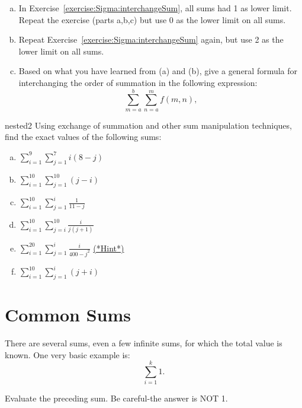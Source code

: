 \begin{exercise}{}
\begin{enumerate}[(a)]
\item
In Exercise~\ref{exercise:Sigma:interchangeSum}, all sums had 1 as lower limit.  Repeat the exercise (parts a,b,c) but use 0 as the lower limit on all sums.
\item
Repeat Exercise~\ref{exercise:Sigma:interchangeSum} again, but use 2 as the lower limit on all sums.
\item
Based on what you have learned from (a) and (b), give a general formula for interchanging the order of summation in the following expression:
\[
\sum_{m=a}^b \sum_{n=a}^m f(m,n),
\]
\end{enumerate}
\end{exercise}


\begin{exercise}{nested2}
Using exchange of summation and other sum manipulation techniques, find the exact values of the following sums:


\begin{multicols}{2}
\begin{enumerate}[(a)]
\item
$\displaystyle{\sum_{i=1}^{9} \sum_{j=1}^{7} i(8-j)}$
\item
$\displaystyle{\sum_{i=1}^{10} \sum_{j=1}^{10} (j-i)}$
\item
$\displaystyle{\sum_{i=1}^{10} \sum_{j=1}^i \frac{1}{11-j}}$
\item
$\displaystyle{\sum_{i=1}^{10} \sum_{j=i}^{10} \frac{i}{j(j+1)}}$
\item
$\displaystyle{\sum_{i=1}^{20} \sum_{j=1}^i \frac{i}{400-j^2}}$ \hyperref[sec:sigma:hints]{(*Hint*)} 
\item
$\displaystyle{\sum_{i=1}^{10} \sum_{j=1}^i (j+i)}$
\end{enumerate}
\end{multicols}
\end{exercise}

\section{Common Sums\quad
{}}\label{sec:CommonSums}
There are several sums, even a few infinite sums, for which the total value is known. One very basic example is:
\[\sum_{i=1}^{k}1.\]

\begin{exercise}{}
Evaluate the preceding sum. Be careful-the answer is NOT 1. 
\end{exercise}

